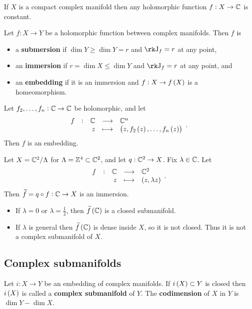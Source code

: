 \begin{exercise}
If $ X $ is a compact complex manifold then any holomorphic function $ f : X \to \mathbb{C} $ is constant.
\end{exercise}

\pagebreak

\begin{definition}
Let $ f : X \to Y $ be a holomorphic function between complex manifolds. Then $ f $ is
\begin{itemize}
\item a \textbf{submersion} if $ \dim Y \ge \dim Y = r $ and $ \rk \J_f = r $ at any point,
\item an \textbf{immersion} if $ r = \dim X \le \dim Y $ and $ \rk \J_f = r $ at any point, and
\item an \textbf{embedding} if it is an immersion and $ f : X \to f\br{X} $ is a homeomorphism.
\end{itemize}
\end{definition}

\begin{example}
Let $ f_2, \dots, f_n : \mathbb{C} \to \mathbb{C} $ be holomorphic, and let
$$ \function[f]{\CC}{\CC^n}{z}{\br{z, f_2\br{z}, \dots, f_n\br{z}}}. $$
Then $ f $ is an embedding.
\end{example}

\begin{example}
Let $ X = \mathbb{C}^2 / \Lambda $ for $ \Lambda = \mathbb{Z}^4 \subset \mathbb{C}^2 $, and let $ q : \mathbb{C}^2 \to X $. Fix $ \lambda \in \mathbb{C} $. Let
$$ \function[f]{\CC}{\CC^2}{z}{\br{z, \lambda z}}. $$
Then $ \widetilde{f} = q \circ f : \mathbb{C} \to X $ is an immersion.
\begin{itemize}
\item If $ \lambda = 0 $ or $ \lambda = \tfrac{1}{2} $, then $ \widetilde{f}\br{\CC} $ is a closed submanifold.
\item If $ \lambda $ is general then $ \widetilde{f}\br{\CC} $ is dense inside $ X $, so it is not closed. Thus it is not a complex submanifold of $ X $.
\end{itemize}
\end{example}

\subsection{Complex submanifolds}

\begin{definition}
Let $ i : X \to Y $ be an embedding of complex manifolds. If $ i\br{X} \subset Y $ is closed then $ i\br{X} $ is called a \textbf{complex submanifold} of $ Y $. The \textbf{codimension} of $ X $ in $ Y $ is $ \dim Y - \dim X $.
\end{definition}

